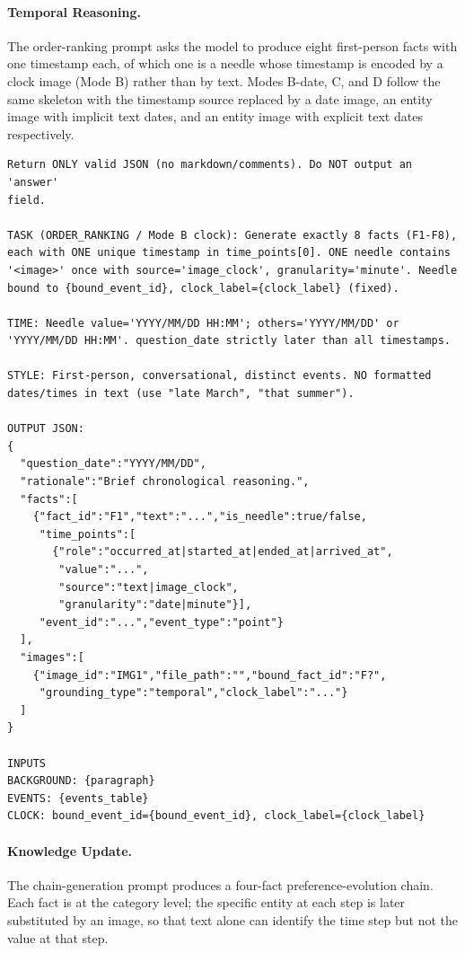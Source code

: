 \documentclass{llmxive}
\begin{document}
\paragraph{Temporal Reasoning.}
The order-ranking prompt asks the model to produce eight first-person facts with one timestamp each, of which one is a needle whose timestamp is encoded by a clock image (Mode B) rather than by text. Modes B-date, C, and D follow the same skeleton with the timestamp source replaced by a date image, an entity image with implicit text dates, and an entity image with explicit text dates respectively.

\begin{promptbox}[colback=black!5, colframe=white!40!black, title={Question Generation: TR (Order Ranking, Mode B)}]{}
\scriptsize
\begin{verbatim}
Return ONLY valid JSON (no markdown/comments). Do NOT output an 'answer'
field.

TASK (ORDER_RANKING / Mode B clock): Generate exactly 8 facts (F1-F8),
each with ONE unique timestamp in time_points[0]. ONE needle contains
'<image>' once with source='image_clock', granularity='minute'. Needle
bound to {bound_event_id}, clock_label={clock_label} (fixed).

TIME: Needle value='YYYY/MM/DD HH:MM'; others='YYYY/MM/DD' or
'YYYY/MM/DD HH:MM'. question_date strictly later than all timestamps.

STYLE: First-person, conversational, distinct events. NO formatted
dates/times in text (use "late March", "that summer").

OUTPUT JSON:
{
  "question_date":"YYYY/MM/DD",
  "rationale":"Brief chronological reasoning.",
  "facts":[
    {"fact_id":"F1","text":"...","is_needle":true/false,
     "time_points":[
       {"role":"occurred_at|started_at|ended_at|arrived_at",
        "value":"...",
        "source":"text|image_clock",
        "granularity":"date|minute"}],
     "event_id":"...","event_type":"point"}
  ],
  "images":[
    {"image_id":"IMG1","file_path":"","bound_fact_id":"F?",
     "grounding_type":"temporal","clock_label":"..."}
  ]
}

INPUTS
BACKGROUND: {paragraph}
EVENTS: {events_table}
CLOCK: bound_event_id={bound_event_id}, clock_label={clock_label}
\end{verbatim}
\end{promptbox}

\paragraph{Knowledge Update.}
The chain-generation prompt produces a four-fact preference-evolution chain. Each fact is at the category level; the specific entity at each step is later substituted by an image, so that text alone can identify the time step but not the value at that step.
\end{document}
